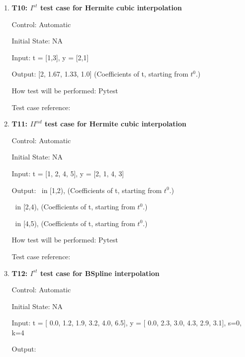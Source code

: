 \documentclass[12pt, titlepage]{article}
\begin{document}
\begin{enumerate}

\item{\textbf{T10: $I^{st}$ test case for Hermite cubic interpolation }\\}

Control: Automatic 

Initial State: NA

Input: t = [1,3], y = [2,1]

Output: [2, 1.67, 1.33, 1.0] (Coefficients of t, starting from $t^{0}$.)


How test will be performed: Pytest

Test case reference: \cite{HermiteCubic} \\

\item{\textbf{T11: ${II}^{nd}$ test case for Hermite  
cubic 
interpolation} \\}

Control: Automatic 

Initial State: NA

Input: t = [1, 2, 4, 5], y = [2, 1, 4, 3]

Output: 
~\newline [1.0,1.0, 1.38888889, 2.0] in [1,2), (Coefficients of t, starting from $t^{0}$.)

~\newline [4.0, 4.0, 1.0, 1.0] in [2,4), (Coefficients of t, starting from $t^{0}$.)

~\newline[3.0, 3.61111111, 4.0, 4.0] in [4,5), (Coefficients of t, starting from $t^{0}$.)

How test will be performed: Pytest

Test case reference: \cite{HermiteCubic2}\\

\item{\textbf{T12: $I^{st}$ test case for BSpline interpolation} \\}

Control: Automatic 

Initial State: NA

Input: t = [ 0.0, 1.2,  1.9,  3.2,  4.0,  6.5], y = [ 0.0,  2.3,  3.0,  4.3,  2.9,  3.1], s=0, k=4


Output: 
~\newline [0, 2.987, -0.574, 14.670,-10.325, 3.1, 0, 0, 0, 0, 0]


\end{enumerate}
\end{document}
